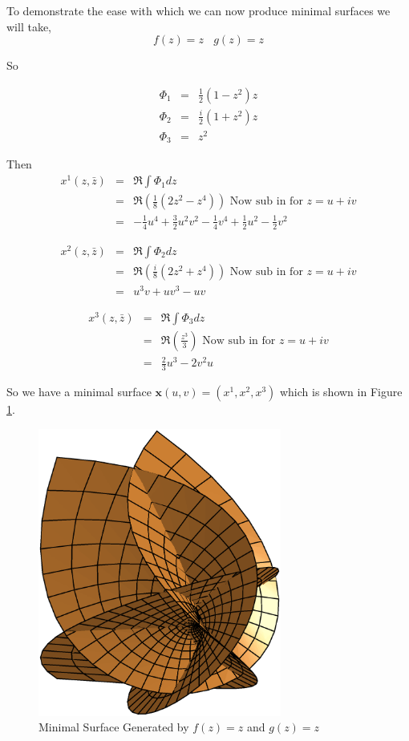 \begin{example}
To demonstrate the ease with which we can now produce minimal surfaces we will take,
\begin{displaymath}
f(z) = z \ \ \ \ g(z) = z
\end{displaymath}

So 

\begin{eqnarray}
\nonumber
\Phi_1 &=& \frac{1}{2}(1-z^2)z \\
\nonumber
\Phi_2 &=& \frac{i}{2}(1+z^2)z \\
\nonumber
\Phi_3 &=& z^2
\end{eqnarray}

Then
\begin{eqnarray}
\nonumber
x^1(z,\bar{z}) &=& \Re \int \Phi_1 dz \\
\nonumber
&=& \Re \left(\frac{1}{8}(2z^2-z^4)\right) \mbox{\ \ \ \ Now sub in for } z=u+iv \\
\nonumber
&=& -\frac{1}{4}u^4+\frac{3}{2}u^2v^2-\frac{1}{4}v^4+\frac{1}{2}u^2-\frac{1}{2}v^2
\end{eqnarray}

\begin{eqnarray}								
\nonumber
x^2(z,\bar{z}) &=& \Re \int \Phi_2 dz \\
\nonumber
&=& \Re \left(\frac{i}{8}(2z^2+z^4)\right) \mbox{\ \ \ \ Now sub in for } z=u+iv \\
\nonumber
&=& u^3v+uv^3-uv
\end{eqnarray}

\begin{eqnarray}								
\nonumber
x^3(z,\bar{z}) &=& \Re \int \Phi_3 dz \\
\nonumber
&=& \Re \left(\frac{z^3}{3}\right) \mbox{\ \ \ \ Now sub in for } z=u+iv \\
\nonumber
&=& \frac{2}{3}u^3-2v^2u
\end{eqnarray} 
\end{example}

So we have a minimal surface $\mathbf x(u,v) = (x^1,x^2,x^3)$ which is shown in Figure \ref{fig:WEExample}.

\begin{figure}[htbp]
	\centering
       \includegraphics[width=8cm]{Images/WEExample.eps}
   \caption{Minimal Surface Generated by $f(z) = z$ and $g(z) = z$}
   \label{fig:WEExample}
\end{figure}


 

